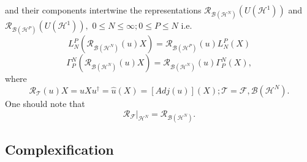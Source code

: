 \documentclass[aps,preprint]{revtex4}%
\begin{document}
and their components intertwine the representations $\mathcal{R}%
_{\mathcal{B}\left(  \mathcal{H}^{N}\right)  }\left(  U\left(  \mathcal{H}%
^{1}\right)  \right)  $ and $\mathcal{R}_{\mathcal{B}\left(  \mathcal{H}%
^{P}\right)  }\left(  U\left(  \mathcal{H}^{1}\right)  \right)  ,$ $0\leq
N\leq\infty;0\leq P\leq N$ i.e.
\begin{equation}
L_{N}^{P}\left(  \mathcal{R}_{\mathcal{B}\left(  \mathcal{H}^{N}\right)
}\left(  u\right)  X\right)  =\mathcal{R}_{\mathcal{B}\left(  \mathcal{H}%
^{P}\right)  }\left(  u\right)  L_{N}^{P}\left(  X\right)
\end{equation}%
\begin{equation}
\Gamma_{P}^{N}\left(  \mathcal{R}_{\mathcal{B}\left(  \mathcal{H}^{N}\right)
}\left(  u\right)  X\right)  =\mathcal{R}_{\mathcal{B}\left(  \mathcal{H}%
^{N}\right)  }\left(  u\right)  \Gamma_{P}^{N}\left(  X\right)  ,
\end{equation}
where
\begin{equation}
\mathcal{R}_{\mathcal{T}}\left(  u\right)  X=uXu^{\dagger}=\hat{u}\left(
X\right)  =\left[  Adj(u)\right]  (X);\mathcal{T=F},\mathcal{B}\left(
\mathcal{H}^{N}\right)  .
\end{equation}
One should note that
\begin{equation}
\left.  \mathcal{R}_{\mathcal{F}}\right\vert _{\mathcal{H}^{N}}=\mathcal{R}%
_{\mathcal{B}\left(  \mathcal{H}^{N}\right)  }.
\end{equation}


\subsection{Complexification}
\end{document}
